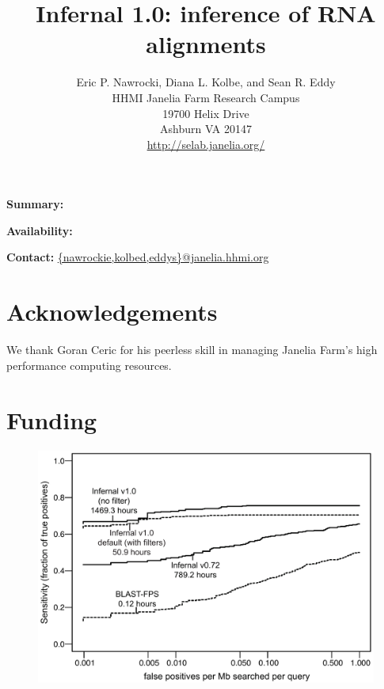 \documentclass[11pt]{article}
\begin{document}
\title{Infernal 1.0: inference of RNA alignments}
\author{Eric P. Nawrocki, Diana L. Kolbe, and Sean R. Eddy\\
HHMI Janelia Farm Research Campus\\
19700 Helix Drive\\
Ashburn VA 20147\\
\url{http://selab.janelia.org/}\\
}
\maketitle

\textbf{Summary:}

\textbf{Availability:}

\textbf{Contact:} \url{{nawrockie,kolbed,eddys}@janelia.hhmi.org}






\section{Acknowledgements}
We thank Goran Ceric for his peerless skill in managing Janelia Farm's
high performance computing resources.

\section{Funding}


\begin{figure}
\begin{center}
\includegraphics[width=6.4in]{figs/roc}

\label{Fig:roc}
\end{center}
\end{figure}

\begin{table}
\begin{center}

\end{center}

\label{Tab:timings}
\end{table}


\end{document}
